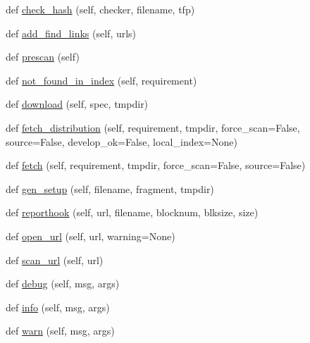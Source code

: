 \begin{DoxyCompactItemize}
\item 
def \hyperlink{classsetuptools_1_1package__index_1_1PackageIndex_a1487a419c7370d7ac604a2f62e1e20a8}{check\+\_\+hash} (self, checker, filename, tfp)
\item 
def \hyperlink{classsetuptools_1_1package__index_1_1PackageIndex_af2814314197cc6aee392b64f303f08c4}{add\+\_\+find\+\_\+links} (self, urls)
\item 
def \hyperlink{classsetuptools_1_1package__index_1_1PackageIndex_a65d775034e7b39ede1a15be9cc17e1aa}{prescan} (self)
\item 
def \hyperlink{classsetuptools_1_1package__index_1_1PackageIndex_a368455ef8e28ab626077dce7ced8d44e}{not\+\_\+found\+\_\+in\+\_\+index} (self, requirement)
\item 
def \hyperlink{classsetuptools_1_1package__index_1_1PackageIndex_a100de731e036d1fc5e9604355e02deed}{download} (self, spec, tmpdir)
\item 
def \hyperlink{classsetuptools_1_1package__index_1_1PackageIndex_a991bcc357db71bc05773ce3bb03c85a4}{fetch\+\_\+distribution} (self, requirement, tmpdir, force\+\_\+scan=False, source=False, develop\+\_\+ok=False, local\+\_\+index=None)
\item 
def \hyperlink{classsetuptools_1_1package__index_1_1PackageIndex_a4fa8a0112703f75c6af17996ce6eb66e}{fetch} (self, requirement, tmpdir, force\+\_\+scan=False, source=False)
\item 
def \hyperlink{classsetuptools_1_1package__index_1_1PackageIndex_a62fc46189fe3177880c7a8a870189d2f}{gen\+\_\+setup} (self, filename, fragment, tmpdir)
\item 
def \hyperlink{classsetuptools_1_1package__index_1_1PackageIndex_ab755a72708d533f6022c9a1b8812eed6}{reporthook} (self, url, filename, blocknum, blksize, size)
\item 
def \hyperlink{classsetuptools_1_1package__index_1_1PackageIndex_aa5e2a575613dde93b7fc71ddc29e2ed1}{open\+\_\+url} (self, url, warning=None)
\item 
def \hyperlink{classsetuptools_1_1package__index_1_1PackageIndex_a34fd05e6bd70cb5fb45df6089a9a0d88}{scan\+\_\+url} (self, url)
\item 
def \hyperlink{classsetuptools_1_1package__index_1_1PackageIndex_a4d45c347357b1bb87fc68aaf037aaf6d}{debug} (self, msg, args)
\item 
def \hyperlink{classsetuptools_1_1package__index_1_1PackageIndex_aaf8b3976306c8eaa1f0c8c70c080efc1}{info} (self, msg, args)
\item 
def \hyperlink{classsetuptools_1_1package__index_1_1PackageIndex_a6942a7d171f22524a12f651b67a7c1a8}{warn} (self, msg, args)
\end{DoxyCompactItemize}
